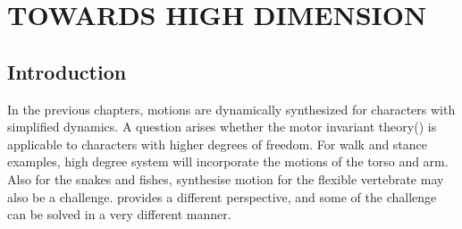 \chapter{TOWARDS HIGH DIMENSION}
\label{chap:highdor}
\graphicspath{{HiDof/HiDofFigs/EPS/}{HiDof/HiDofFigs/}}
\section{Introduction}
In the previous chapters, motions are dynamically synthesized for characters with simplified dynamics.
A question arises whether the  motor invariant theory(\moit) is applicable to characters with higher degrees of freedom.
For walk and stance examples, high degree system will incorporate the motions of the torso and arm.
Also for the snakes and fishes, synthesise motion for the flexible vertebrate may also be a challenge.
\moit provides a different perspective, and some of the challenge can be solved in a very different manner.



